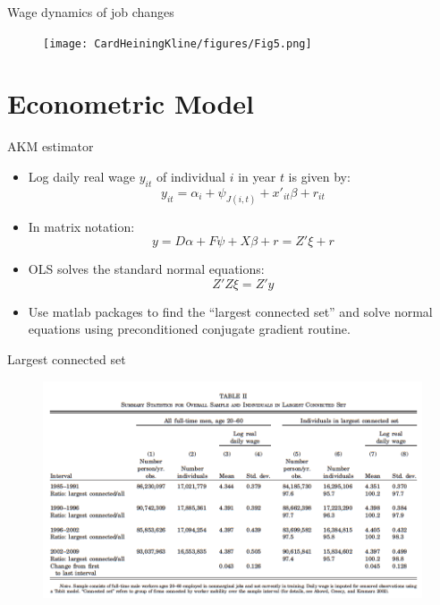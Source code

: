 \documentclass[notes=show]{beamer}
\begin{document}
\begin{frame}{Wage dynamics of job changes}
\begin{figure}[p!]
 \texttt{[image: CardHeiningKline/figures/Fig5.png]} 
\end{figure}
\end{frame}

\section{Econometric Model}

\begin{frame}{AKM estimator}
\begin{itemize} 
    \item Log daily real wage $y_{it}$ of individual $i$ in year $t$ is given by:
    \begin{equation} \label{eq_AKM}
	y_{it} = \alpha_i + \psi_{J(i,t)} + x'_{it}\beta + r_{it}
    \end{equation}
\item In matrix notation:
\begin{equation}
    y = D \alpha + F \psi + X \beta +r = Z' \xi + r
\end{equation}
\item OLS solves the standard normal equations:
\begin{equation}
    Z'Z \xi = Z'y
\end{equation}
\item Use matlab packages to find the ``largest connected set'' and solve normal equations using preconditioned conjugate gradient routine.
\end{itemize}
\end{frame}

\begin{frame}{Largest connected set}
\begin{figure}[p!]
 \includegraphics[width=\textwidth]{figures/Table2} 
\end{figure}
\end{frame}
\end{document}
